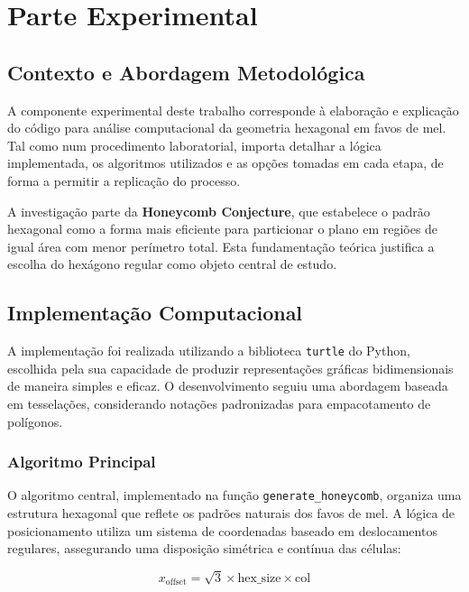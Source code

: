 \documentclass[12pt,a4paper,oneside]{extarticle}
\begin{document}
\clearpage

\section{Parte Experimental}

\subsection{Contexto e Abordagem Metodológica}

A componente experimental deste trabalho corresponde à elaboração e explicação do código para análise computacional da geometria hexagonal em favos de mel. Tal como num procedimento laboratorial, importa detalhar a lógica implementada, os algoritmos utilizados e as opções tomadas em cada etapa, de forma a permitir a replicação do processo.

A investigação parte da \textbf{Honeycomb Conjecture}, que estabelece o padrão hexagonal como a forma mais eficiente para particionar o plano em regiões de igual área com menor perímetro total. Esta fundamentação teórica justifica a escolha do hexágono regular como objeto central de estudo.

\subsection{Implementação Computacional}

A implementação foi realizada utilizando a biblioteca \texttt{turtle} do Python, escolhida pela sua capacidade de produzir representações gráficas bidimensionais de maneira simples e eficaz. O desenvolvimento seguiu uma abordagem baseada em tesselações, considerando notações padronizadas para empacotamento de polígonos.

\subsubsection{Algoritmo Principal}

O algoritmo central, implementado na função \texttt{generate\_honeycomb}, organiza uma estrutura hexagonal que reflete os padrões naturais dos favos de mel. A lógica de posicionamento utiliza um sistema de coordenadas baseado em deslocamentos regulares, assegurando uma disposição simétrica e contínua das células:

\begin{equation}
x_{\text{offset}} = \sqrt{3} \times \text{hex\_size} \times \text{col}
\end{equation}
\end{document}
